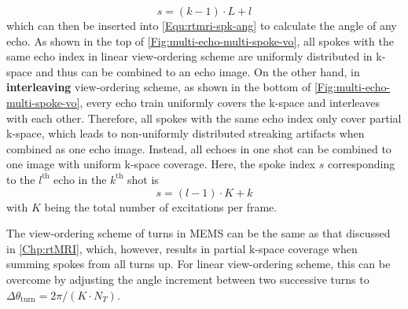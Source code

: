 \begin{equation} \label{Equ:mems-linear}
  s = (k-1) \cdot L + l
\end{equation}
which can then be inserted into \cref{Equ:rtmri-spk-ang} to calculate the angle of any echo. As shown in the top of \cref{Fig:multi-echo-multi-spoke-vo}, all spokes with the same echo index in linear view-ordering scheme are uniformly distributed in k-space and thus can be combined to an echo image. On the other hand, in \textbf{interleaving} view-ordering scheme, as shown in the bottom of \cref{Fig:multi-echo-multi-spoke-vo}, every echo train uniformly covers the k-space and interleaves with each other. Therefore, all spokes with the same echo index only cover partial k-space, which leads to non-uniformly distributed streaking artifacts when combined as one echo image. Instead, all echoes in one shot can be combined to one image with uniform k-space coverage. Here, the spoke index $s$ corresponding to the $l^{\text{th}}$ echo in the $k^{\text{th}}$ shot is
\begin{equation} \label{Equ:mems-interleaving}
  s = (l-1) \cdot K + k
\end{equation}
with $K$ being the total number of excitations per frame.

The view-ordering scheme of turns in MEMS can be the same as that discussed in \cref{Chp:rtMRI}, which, however, results in partial k-space coverage when summing spokes from all turns up. For linear view-ordering scheme, this can be overcome by adjusting the angle increment between two successive turns to $\Delta \theta_{\text{turn}} = 2\pi / (K \cdot N_T)$.


